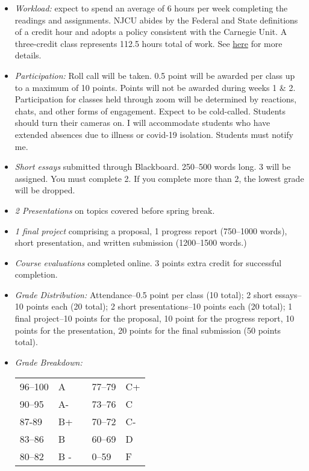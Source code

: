 \documentclass[article,oneside]{memoir}
\begin{document}
\begin{itemize}


\item \textit{Workload:} expect to spend an average of 6 hours per week completing the readings and assignments. NJCU abides by the Federal and State definitions of a credit hour and adopts a policy consistent with the Carnegie Unit. A three-credit class represents 112.5 hours total of work. See \href{http://scottoconnor.org/resources/Credit.pdf}{here} for more details.

\item \textit{Participation:} Roll call will be taken. 0.5 point will be awarded per class up to a maximum of 10 points. Points will not be awarded during weeks 1 \& 2. Participation for classes held through zoom will be determined by reactions, chats, and other forms of engagement. Expect to be cold-called. Students should turn their cameras on. I will accommodate students who have extended absences due to illness or covid-19 isolation. Students must notify me. 


\item \textit{Short essays} submitted through Blackboard. 250--500 words long. 3 will be assigned. You must complete 2. If you complete more than 2, the lowest grade will be dropped.
 
\item \textit{2 Presentations} on topics covered before spring break.   

\item \textit{1 final project} comprising a proposal, 1 progress report (750--1000 words), short presentation, and written submission (1200--1500 words.)

\item \textit{Course evaluations} completed online. 3 points extra credit for successful completion.


\item \textit{Grade Distribution:} Attendance--0.5 point per class (10 total); 2 short essays--10 points each (20 total); 2 short presentations--10 points each (20 total); 1 final project--10 points for the proposal, 10 point for the progress report, 10 points for the presentation, 20 points for the final submission (50 points total).




\item \textit{Grade Breakdown:}

 \begin{tabular}{ | l | l | p{2cm} | l | l | }
    \hline 
96--100 & A  & &  77--79 &  C+ \\  
90--95 & A- & &  73--76 & C \\
87-89 & B+ &  &  70--72 & C- \\ 
83--86 & B  & &  60--69 & D\\
80--82 & B - & & 0--59 & F\\ \hline
    \end{tabular}


\end{itemize}
\end{document}
